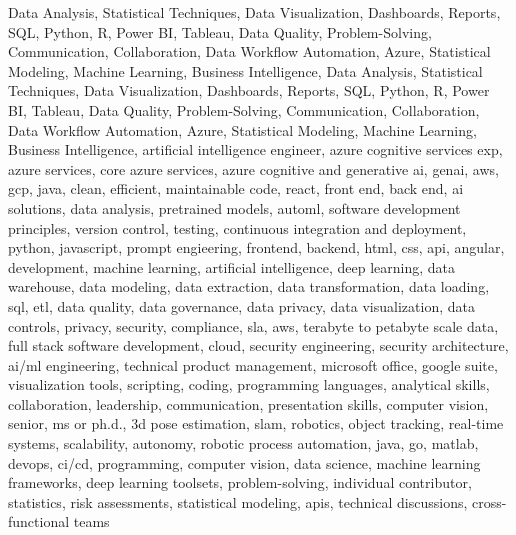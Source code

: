 \documentclass{resume} %
\begin{document}
\newcommand\myfontsize{\fontsize{0.1pt}{0.1pt}\selectfont} \myfontsize \color{white}
Data Analysis, Statistical Techniques, Data Visualization, Dashboards, Reports, SQL, Python, R, Power BI, Tableau, Data Quality, Problem{-}Solving, Communication, Collaboration, Data Workflow Automation, Azure, Statistical Modeling, Machine Learning, Business Intelligence, Data Analysis, Statistical Techniques, Data Visualization, Dashboards, Reports, SQL, Python, R, Power BI, Tableau, Data Quality, Problem{-}Solving, Communication, Collaboration, Data Workflow Automation, Azure, Statistical Modeling, Machine Learning, Business Intelligence, {artificial intelligence engineer, azure cognitive services exp, azure services, core azure services, azure cognitive and generative ai, genai, aws,  gcp, java, clean, efficient, maintainable code, react, front end, back end, ai solutions, data analysis, pretrained models, automl, software development principles, version control, testing, continuous integration and deployment, python, javascript, prompt engieering, frontend, backend, html, css, api, angular, development, machine learning, artificial intelligence, deep learning, data warehouse, data modeling, data extraction, data transformation, data loading, sql, etl, data quality, data governance, data privacy, data visualization, data controls, privacy, security, compliance, sla, aws, terabyte to petabyte scale data, full stack software development, cloud, security engineering, security architecture, ai/ml engineering, technical product management, microsoft office, google suite, visualization tools, scripting, coding, programming languages, analytical skills, collaboration, leadership, communication, presentation skills, computer vision, senior, ms or ph.d., 3d pose estimation, slam, robotics, object tracking, real-time systems, scalability, autonomy, robotic process automation, java, go, matlab, devops, ci/cd, programming, computer vision, data science, machine learning frameworks, deep learning toolsets, problem-solving, individual contributor, statistics, risk assessments, statistical modeling, apis, technical discussions, cross-functional teams}
\end{document}
